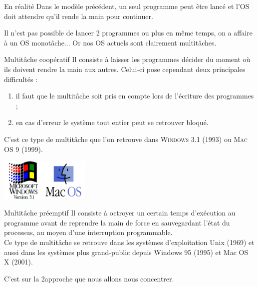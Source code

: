 \documentclass[10pt]{nsibeamer}
\begin{document}
\begin{frame}{En réalité}
Dans le modèle précédent, un seul programme peut être lancé et l'OS doit attendre qu'il \og rende la main\fg{} pour continuer.\\\pause

Il n'est pas possible de lancer 2 programmes ou plus en même temps, on a affaire à un OS \alert{monotâche}... Or nos OS actuels sont clairement multitâches.
\end{frame}
\begin{frame}{Multitâche coopératif}
Il consiste à laisser les programmes décider du moment où ils doivent rendre la main aux autres. Celui-ci pose cependant deux principales difficultés :\pause
\begin{enumerate}[--]
	\item il faut que le multitâche soit pris en compte lors de l'écriture des programmes ;\pause
    \item en cas d'erreur le système tout entier peut se retrouver bloqué.\pause
\end{enumerate}
C'est ce type de multitâche que l'on retrouve dans \textsc{Windows 3.1} (1993) ou \textsc{Mac OS 9} (1999).\\
\begin{center}
\includegraphics[height=2cm]{img/win31}\hspace{2cm}\includegraphics[height=2cm]{img/macos}
\end{center}
\end{frame}
\begin{frame}{Multitâche préemptif}
Il consiste à octroyer un certain temps d'exécution au programme avant de reprendre la main de force en sauvegardant l'état du processus, au moyen d'une interruption programmable.\\\pause
Ce type de multitâche se retrouve dans les systèmes d'exploitation Unix (1969) et aussi dans les systèmes plus grand-public depuis Windows 95 (1995) et Mac OS X (2001).\\\pause

C'est sur la 2\eme approche que nous allons nous concentrer.
\end{frame}
\end{document}
